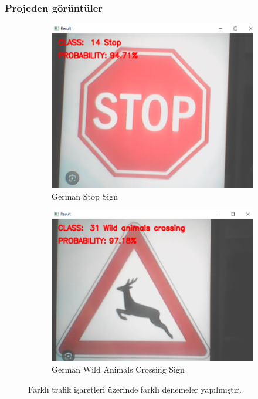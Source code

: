 \documentclass{article}
\begin{document}
\subsubsection{Projeden görüntüler}
\begin{figure}[h]
    \centering
    \begin{subfigure}{0.5\textwidth}
        \centering
        \includegraphics[width=1\linewidth]{image/Resim50.PNG}
        \caption{German Stop Sign}
        \label{fig:resim1}
    \end{subfigure}%
    \begin{subfigure}{0.5\textwidth}
        \centering
        \includegraphics[width=1.1\linewidth]{image/Resim51.PNG}
        \caption{German Wild Animals Crossing Sign}
        \label{fig:resim2}
    \end{subfigure}
    \caption{Farklı trafik işaretleri üzerinde farklı denemeler yapılmıştır.}
    \label{fig:iki_resim}
\end{figure}
\end{document}
